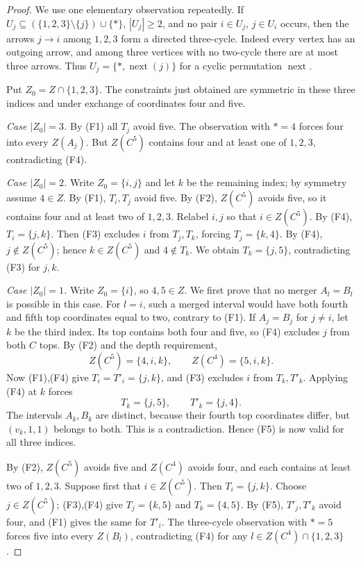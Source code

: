 \documentclass[11pt,a4paper]{article}
\theoremstyle{remark}\newtheorem{remark}[theorem]{Remark}
\begin{document}
\begin{proof}
We use one elementary observation repeatedly. If $U_j\subseteq(\{1,2,3\}\setminus\{j\})\cup\{*\}$, $|U_j|\ge2$, and no pair $i\in U_j$, $j\in U_i$ occurs, then the arrows $j\to i$ among $1,2,3$ form a directed three-cycle. Indeed every vertex has an outgoing arrow, and among three vertices with no two-cycle there are at most three arrows. Thus $U_j=\{*,\operatorname{next}(j)\}$ for a cyclic permutation $\operatorname{next}$.

Put $Z_0=Z\cap\{1,2,3\}$. The constraints just obtained are symmetric in these three indices and under exchange of coordinates four and five.

\emph{Case $|Z_0|=3$.} By (F1) all $T_j$ avoid five. The observation with $*=4$ forces four into every $Z(A_j)$. But $Z(C^5)$ contains four and at least one of $1,2,3$, contradicting (F4).

\emph{Case $|Z_0|=2$.} Write $Z_0=\{i,j\}$ and let $k$ be the remaining index; by symmetry assume $4\in Z$. By (F1), $T_i,T_j$ avoid five. By (F2), $Z(C^5)$ avoids five, so it contains four and at least two of $1,2,3$. Relabel $i,j$ so that $i\in Z(C^5)$. By (F4), $T_i=\{j,k\}$. Then (F3) excludes $i$ from $T_j,T_k$, forcing $T_j=\{k,4\}$. By (F4), $j\notin Z(C^5)$; hence $k\in Z(C^5)$ and $4\notin T_k$. We obtain $T_k=\{j,5\}$, contradicting (F3) for $j,k$.

\emph{Case $|Z_0|=1$.} Write $Z_0=\{i\}$, so $4,5\in Z$. We first prove that no merger $A_l=B_l$ is possible in this case. For $l=i$, such a merged interval would have both fourth and fifth top coordinates equal to two, contrary to (F1). If $A_j=B_j$ for $j\ne i$, let $k$ be the third index. Its top contains both four and five, so (F4) excludes $j$ from both $C$ tops. By (F2) and the depth requirement,
\[
Z(C^5)=\{4,i,k\},\qquad Z(C^4)=\{5,i,k\}.
\]
Now (F1),(F4) give $T_i=T'_i=\{j,k\}$, and (F3) excludes $i$ from $T_k,T'_k$. Applying (F4) at $k$ forces
\[
T_k=\{j,5\},\qquad T'_k=\{j,4\}.
\]
The intervals $A_k,B_k$ are distinct, because their fourth top coordinates differ, but $(v_k,1,1)$ belongs to both. This is a contradiction. Hence (F5) is now valid for all three indices.

By (F2), $Z(C^5)$ avoids five and $Z(C^4)$ avoids four, and each contains at least two of $1,2,3$. Suppose first that $i\in Z(C^5)$. Then $T_i=\{j,k\}$. Choose $j\in Z(C^5)$; (F3),(F4) give $T_j=\{k,5\}$ and $T_k=\{4,5\}$. By (F5), $T'_j,T'_k$ avoid four, and (F1) gives the same for $T'_i$. The three-cycle observation with $*=5$ forces five into every $Z(B_l)$, contradicting (F4) for any $l\in Z(C^4)\cap\{1,2,3\}$.


\end{proof}
\end{document}
